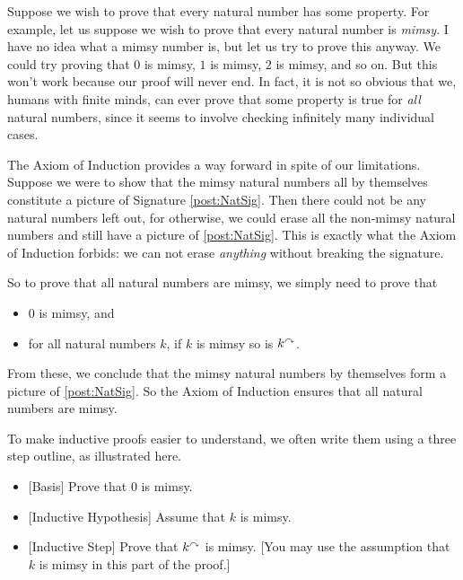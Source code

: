 Suppose we wish to prove that every natural number has some
property. For example, let us suppose we wish to prove that every
natural number is \emph{mimsy}.  I have no idea what a mimsy number
is, but let us try to prove this anyway. We could try proving that $0$
is mimsy, $1$ is mimsy, $2$ is mimsy, and so on.  But this won't work
because our proof will never end. In fact, it is not so obvious that
we, humans with finite minds, can ever prove that some property is
true for \emph{all} natural numbers, since it seems to involve
checking infinitely many individual cases.

The Axiom of Induction provides a way forward in spite of our
limitations.  Suppose we were to show that the mimsy natural numbers
all by themselves constitute a picture of Signature
\ref{post:NatSig}.  Then there could not be any natural numbers
left out, for otherwise, we could erase all the non-mimsy natural
numbers and still have a picture of \ref{post:NatSig}. This
is exactly what the Axiom of Induction forbids: we can not erase
\emph{anything} without breaking the signature.

So to prove that all natural numbers are mimsy, we simply need to
prove that
\begin{itemize}
\item $0$ is mimsy, and
\item for all natural numbers $k$, if $k$ is mimsy so is $k^\curvearrowright$.
\end{itemize}
From these, we conclude that the mimsy natural numbers by themselves form a picture of \ref{post:NatSig}. So the Axiom of Induction ensures that all natural numbers
are mimsy.


To make inductive proofs easier to understand, we often write them
using a three step outline, as illustrated here.
\begin{itemize}
\item{}[Basis] Prove that $0$ is mimsy.
\item{}[Inductive Hypothesis] Assume that $k$ is mimsy.
\item{}[Inductive Step] Prove that $k^\curvearrowright$ is mimsy. [You may use the
  assumption that $k$ is mimsy in this part of the proof.]
\end{itemize}

